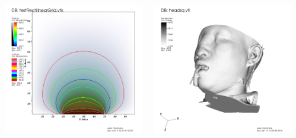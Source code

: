 \begin{frame}
\pause
\vspace{2mm}
\begin{columns}
\begin{column}{3cm}
	\includegraphics[width=.9\columnwidth]{figs/visit-handson/testRectilinearGrid}
\end{column}
\begin{column}{3cm}
	\includegraphics[width=.9\columnwidth]{figs/visit-handson/headsq}
\end{column}
\begin{column}{3cm}

\end{column}
\end{columns}
\end{frame}
